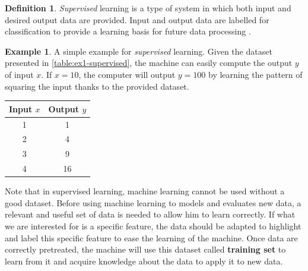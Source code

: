 \documentclass[11pt, openany]{report}
\theoremstyle{plain}
\theoremstyle{definition}
\newtheorem{defn}{Definition}[section]
\newtheorem{exmp}{Example}[section]
\theoremstyle{remark}
\begin{document}
\begin{defn}
\textit{Supervised} learning is a type of system in which both input and desired output data are provided. Input and output data are labelled for classification to provide a learning basis for future data processing \cite{Supervised-1}. 
\end{defn}

\begin{exmp}
A simple example for \textit{supervised} learning. Given the dataset presented in \autoref{table:ex1-supervised}, the machine can easily compute the output $y$ of input $x$. 
If $x = 10$, the computer will output $y = 100$ by learning the pattern of squaring the input thanks to the provided dataset.  

\newpage
\begin{center}
    \begin{tabular}{|c|c|}
      \hline
      Input $x$ & Output $y$ \\
      \hline
      1 & 1 \\
      \hline
      2 & 4 \\
      \hline
      3 & 9 \\
      \hline
      4 & 16 \\
      \hline
    \end{tabular}
    \label{table:ex1-supervised}
\end{center}
\end{exmp}

Note that in supervised learning, machine learning cannot be used without a good dataset. Before using machine learning to models and evaluates new data, a relevant and useful set of data is needed to allow him to learn correctly. If what we are interested for is a specific feature, the data should be adapted to highlight and label this specific feature to ease the learning of the machine. Once data are correctly pretreated, the machine will use this dataset called \textbf{training set} to learn from it and acquire knowledge about the data to apply it to new data.
\end{document}
